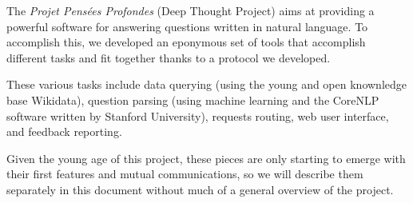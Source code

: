 The {\em Projet Pensées Profondes} (Deep Thought Project) aims at
providing a powerful software for answering questions written in
natural language.
To accomplish this, we developed an eponymous set of tools that
accomplish different tasks and fit together thanks to a protocol
we developed.

These various tasks include data querying (using the young and open
knownledge base Wikidata), question parsing (using machine learning and the
CoreNLP software written by Stanford University),
requests routing, web user interface, and feedback reporting.

Given the young age of this project, these pieces are only starting
to emerge with their first features and mutual communications,
so we will describe them separately in this document without
much of a general overview of the project.
